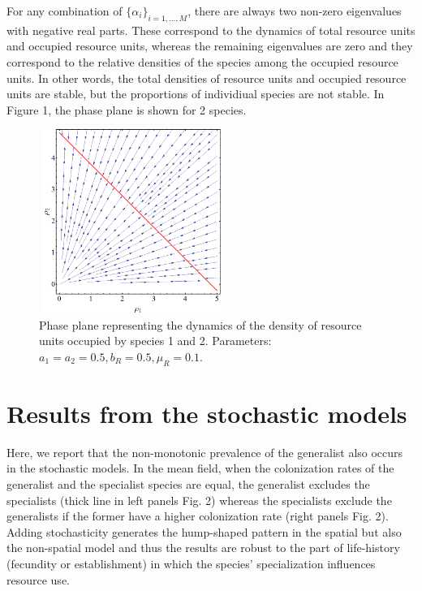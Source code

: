 \documentclass[8pt,a4paper]{article}
\begin{document}
For any combination of $\{\alpha_i\}_{i=1,\ldots,M}$, there are always two non-zero eigenvalues with negative real parts. These correspond to the dynamics of total resource units and occupied resource units, whereas the remaining eigenvalues are  zero and they correspond to the relative densities of the species among the occupied resource units. In other words, the total densities of resource units and occupied resource units are stable, but the proportions of individiual species are not stable. In Figure 1, the phase plane is shown for 2 species.

\begin{figure}[!ht]
\begin{center}
\includegraphics[height=6cm,width=6cm]{FigureX}
\caption{  Phase plane representing the dynamics of the density of resource units occupied by species 1 and 2. Parameters: $a_1= a_2 = 0.5, b_R=0.5, \mu_R= 0.1$.}
\end{center}
\end{figure}

\section{Results from the stochastic models }
Here, we report that the non-monotonic prevalence of the generalist also occurs in the stochastic models.
In the mean field, when the colonization rates of the generalist and the specialist species are equal, the generalist excludes the specialists (thick line in left panels Fig. 2) whereas the specialists exclude the generalists if the former have a higher colonization rate (right panels Fig. 2).
Adding stochasticity generates the hump-shaped pattern in the spatial but also the non-spatial model and thus the results are robust to the part of life-history (fecundity or establishment) in which the species’ specialization influences resource use.
\end{document}
